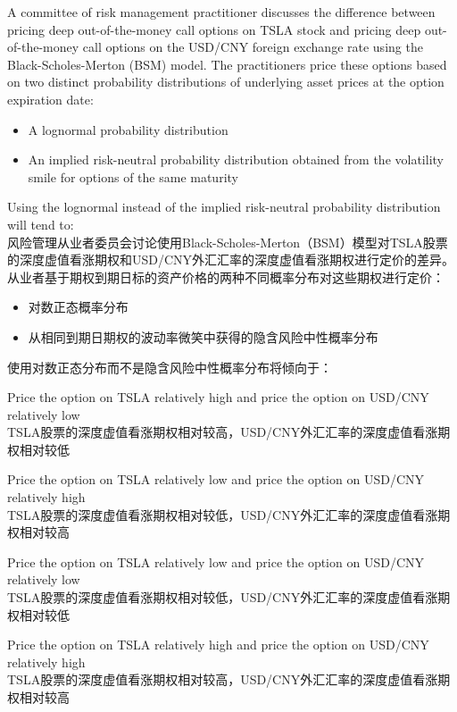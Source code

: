 \documentclass{article}
\newcounter{question} %
\begin{document}
\begin{question}
    A committee of risk management practitioner discusses the difference between pricing deep out-of-the-money call options on TSLA stock and pricing deep out-of-the-money call options on the USD/CNY foreign exchange rate using the Black-Scholes-Merton (BSM) model. The practitioners price these options based on two distinct probability distributions of underlying asset prices at the option expiration date:
    \begin{itemize}
        \item A lognormal probability distribution
        \item An implied risk-neutral probability distribution obtained from the volatility smile for options of the same maturity
    \end{itemize}
    Using the lognormal instead of the implied risk-neutral probability distribution will tend to:
    \\    风险管理从业者委员会讨论使用Black-Scholes-Merton（BSM）模型对TSLA股票的深度虚值看涨期权和USD/CNY外汇汇率的深度虚值看涨期权进行定价的差异。从业者基于期权到期日标的资产价格的两种不同概率分布对这些期权进行定价：
    \begin{itemize}
        \item 对数正态概率分布
        \item 从相同到期日期权的波动率微笑中获得的隐含风险中性概率分布
    \end{itemize}
    使用对数正态分布而不是隐含风险中性概率分布将倾向于：
    
\end{question}

\begin{choices}
    \item Price the option on TSLA relatively high and price the option on USD/CNY relatively low
    \\ TSLA股票的深度虚值看涨期权相对较高，USD/CNY外汇汇率的深度虚值看涨期权相对较低
    \item Price the option on TSLA relatively low and price the option on USD/CNY relatively high
    \\ TSLA股票的深度虚值看涨期权相对较低，USD/CNY外汇汇率的深度虚值看涨期权相对较高
    \item Price the option on TSLA relatively low and price the option on USD/CNY relatively low
    \\ TSLA股票的深度虚值看涨期权相对较低，USD/CNY外汇汇率的深度虚值看涨期权相对较低
    \item Price the option on TSLA relatively high and price the option on USD/CNY relatively high
    \\ TSLA股票的深度虚值看涨期权相对较高，USD/CNY外汇汇率的深度虚值看涨期权相对较高
\end{choices}
\end{document}
